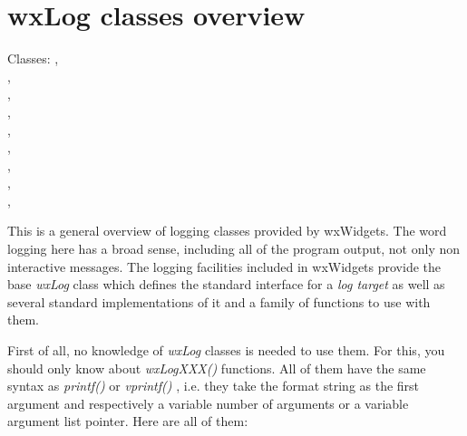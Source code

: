 \section{wxLog classes overview}\label{wxlogoverview}

Classes: ,\\
,\\
,\\
,\\
,\\
,\\
,\\
,\\
,\\

This is a general overview of logging classes provided by wxWidgets. The word
logging here has a broad sense, including all of the program output, not only
non interactive messages. The logging facilities included in wxWidgets provide
the base {\it wxLog} class which defines the standard interface for a {\it log
target} as well as several standard implementations of it and a family of
functions to use with them.

First of all, no knowledge of {\it wxLog} classes is needed to use them. For
this, you should only know about {\it wxLogXXX()} functions. All of them have
the same syntax as {\it printf()} or {\it vprintf()} , i.e. they take the
format string as the first argument and respectively a variable number of
arguments or a variable argument list pointer. Here are all of them:

